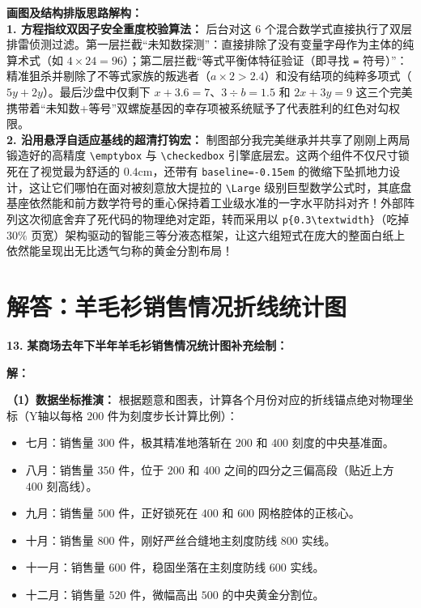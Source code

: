 \documentclass[12pt, a4paper]{ctexrep}
\begin{document}
\vspace{0.4cm}
{\small\color{blue!70!black}
\textbf{画图及结构排版思路解构：}\\
\textbf{1. 方程指纹双因子安全重度校验算法：} 后台对这 6 个混合数学式直接执行了双层排雷侦测过滤。第一层拦截“未知数探测”：直接排除了没有变量字母作为主体的纯算术式（如 $4 \times 24 = 96$）；第二层拦截“等式平衡体特征验证（即寻找 \texttt{=} 符号）”：精准狙杀并剔除了不等式家族的叛逃者（$a \times 2 > 2.4$）和没有结项的纯粹多项式（$5y + 2y$）。最后沙盘中仅剩下 $x + 3.6 = 7$、$3 \div b = 1.5$ 和 $2x + 3y = 9$ 这三个完美携带着“未知数+等号”双螺旋基因的幸存项被系统赋予了代表胜利的红色对勾权限。\\
\textbf{2. 沿用悬浮自适应基线的超清打钩宏：} 制图部分我完美继承并共享了刚刚上两局锻造好的高精度 \texttt{\textbackslash{}emptybox} 与 \texttt{\textbackslash{}checkedbox} 引擎底层宏。这两个组件不仅尺寸锁死在了视觉最为舒适的 $0.4\mathrm{cm}$，还带有 \texttt{baseline=-0.15em} 的微缩下坠抓地力设计，这让它们哪怕在面对被刻意放大提拉的 \texttt{\textbackslash{}Large} 级别巨型数学公式时，其底盘基座依然能和前方数学符号的重心保持着工业级水准的一字水平防抖对齐！外部阵列这次彻底舍弃了死代码的物理绝对定距，转而采用以 \texttt{p\{0.3\textbackslash{}textwidth\}}（吃掉 $30\%$ 页宽）架构驱动的智能三等分液态框架，让这六组短式在庞大的整面白纸上依然能呈现出无比透气匀称的黄金分割布局！
}
\newpage

\section{解答：羊毛衫销售情况折线统计图}

\vspace{0.6cm}

\textbf{\LARGE 13.} \textbf{某商场去年下半年羊毛衫销售情况统计图补充绘制：}

\vspace{0.6cm}
\textbf{解：}

\textbf{（1）数据坐标推演：}
根据题意和图表，计算各个月份对应的折线锚点绝对物理坐标（Y轴以每格 $200$ 件为刻度步长计算比例）：
\begin{itemize}
    \item 七月：销售量 $300$ 件，极其精准地落斩在 $200$ 和 $400$ 刻度的中央基准面。
    \item 八月：销售量 $350$ 件，位于 $200$ 和 $400$ 之间的四分之三偏高段（贴近上方 $400$ 刻高线）。
    \item 九月：销售量 $500$ 件，正好锁死在 $400$ 和 $600$ 网格腔体的正核心。
    \item 十月：销售量 $800$ 件，刚好严丝合缝地主刻度防线 $800$ 实线。
    \item 十一月：销售量 $600$ 件，稳固坐落在主刻度防线 $600$ 实线。
    \item 十二月：销售量 $520$ 件，微幅高出 $500$ 的中央黄金分割位。
\end{itemize}
\end{document}
